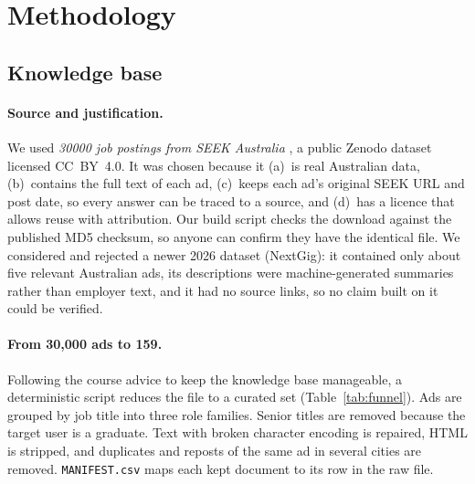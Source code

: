 \section{Methodology}\label{sec:method}

\subsection{Knowledge base}\label{sec:data}

\paragraph{Source and justification.} We used \emph{30000 job postings from SEEK Australia} \citep{jobspikr2018seek}, a public Zenodo dataset licensed CC~BY~4.0. It was chosen because it (a)~is real Australian data, (b)~contains the full text of each ad, (c)~keeps each ad's original SEEK URL and post date, so every answer can be traced to a source, and (d)~has a licence that allows reuse with attribution. Our build script checks the download against the published MD5 checksum, so anyone can confirm they have the identical file. We considered and rejected a newer 2026 dataset (NextGig): it contained only about five relevant Australian ads, its descriptions were machine-generated summaries rather than employer text, and it had no source links, so no claim built on it could be verified.

\paragraph{From 30,000 ads to 159.} Following the course advice to keep the knowledge base manageable, a deterministic script reduces the file to a curated set (Table~\ref{tab:funnel}). Ads are grouped by job title into three role families. Senior titles are removed because the target user is a graduate. Text with broken character encoding is repaired, HTML is stripped, and duplicates and reposts of the same ad in several cities are removed. \texttt{MANIFEST.csv} maps each kept document to its row in the raw file.

